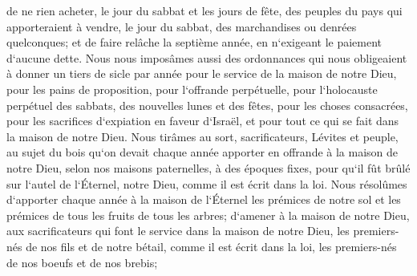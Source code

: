 \verse de ne rien acheter, le jour du sabbat et les jours de fête, des peuples du pays qui apporteraient à vendre, le jour du sabbat, des marchandises ou denrées quelconques; et de faire relâche la septième année, en n`exigeant le paiement d`aucune dette. 
\verse Nous nous imposâmes aussi des ordonnances qui nous obligeaient à donner un tiers de sicle par année pour le service de la maison de notre Dieu, 
\verse pour les pains de proposition, pour l`offrande perpétuelle, pour l`holocauste perpétuel des sabbats, des nouvelles lunes et des fêtes, pour les choses consacrées, pour les sacrifices d`expiation en faveur d`Israël, et pour tout ce qui se fait dans la maison de notre Dieu. 
\verse Nous tirâmes au sort, sacrificateurs, Lévites et peuple, au sujet du bois qu`on devait chaque année apporter en offrande à la maison de notre Dieu, selon nos maisons paternelles, à des époques fixes, pour qu`il fût brûlé sur l`autel de l`Éternel, notre Dieu, comme il est écrit dans la loi. 
\verse Nous résolûmes d`apporter chaque année à la maison de l`Éternel les prémices de notre sol et les prémices de tous les fruits de tous les arbres; 
\verse d`amener à la maison de notre Dieu, aux sacrificateurs qui font le service dans la maison de notre Dieu, les premiers-nés de nos fils et de notre bétail, comme il est écrit dans la loi, les premiers-nés de nos boeufs et de nos brebis; 

